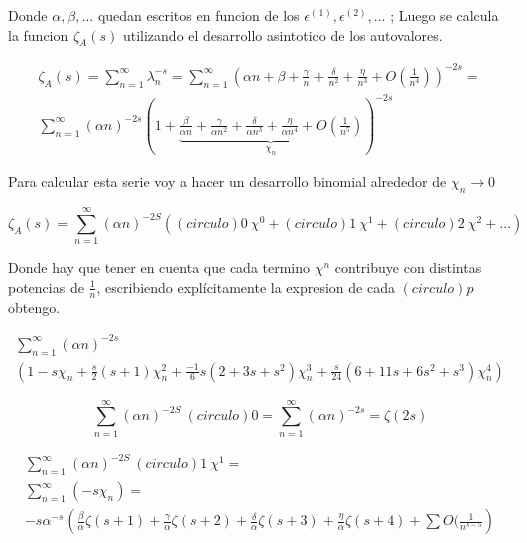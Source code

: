 Donde $\alpha, \beta , ... $ quedan escritos en funcion de los $\epsilon ^{(1)},\epsilon^{(2)}, ... $ ; 
Luego se calcula la funcion $\zeta _A (s) $ utilizando el desarrollo asintotico de los autovalores.
    
\begin{equation}
\begin{array}{cc}
    \zeta _{A} (s) = \sum _{n=1} ^{\infty} \lambda _n ^ {-s} =
    \sum _{n=1} ^{\infty} 
    \left(
    \alpha n + 
    \beta + 
    \frac{\gamma}{n} +
    \frac{\delta}{n ^2} +
    \frac{\eta}{n^3} +
    O( \frac{1}{n ^{4} }  )
    \right) ^{-2 s} = \\
    \sum _{n=1} ^{\infty} 
    (\alpha n) ^{- 2 s} 
    \left(
    1 +     
    \underbrace{
        \frac{\beta}{\alpha n} + 
        \frac{\gamma}{\alpha n^2} +
        \frac{\delta}{\alpha n ^3} +
        \frac{\eta}{\alpha n^4} +
        O(\frac{1}{n ^{5}} ) } _{ \chi _n}
    \right ) ^{-2 s}
\end{array}
\end{equation}

Para calcular esta serie voy a hacer un desarrollo binomial alrededor de $\chi _n \rightarrow{0} $ 

\begin{equation}
\zeta _{A} (s) = 
\sum _{n=1} ^{\infty}
( \alpha n ) ^{-2 S}
\left(
(circulo){0} \ \chi ^0 + (circulo){1} \ \chi ^1  + (circulo){2} \ \chi ^2 + ...
\right)
\end{equation}

Donde hay que tener en cuenta que cada termino $\chi ^{n} $ contribuye con distintas potencias de $\frac{1}{n}$, escribiendo explícitamente la expresion de cada $(circulo){p}$ obtengo.

\begin{equation}
\begin{array}{c}
    \sum _{n=1} ^{\infty}  (\alpha n) ^{- 2 s} \\ 
    \left(
    1- s \chi _n + 
    \frac{s}{2} (s+1) \chi _n ^2  +
    \frac{-1}{6} s (2+3s+s^2) \chi _n ^{3} +
    \frac{s}{24} (6+11s +6s^2+s^3) \chi _n ^4
    \right)
\end{array}
\end{equation}


\begin{equation}
\sum _{n=1} ^{\infty}
( \alpha n ) ^{-2 S} \ 
(circulo){0} = \sum _{n=1} ^{\infty} (\alpha n )^ {-2 s} = \zeta (2 s)
\end{equation}

\begin{equation}
\begin{array}{cc}
    \sum _{n=1} ^{\infty}
    ( \alpha n )   ^{-2 S} \ 
    (circulo){1} \ \chi ^1 = \\ 
    \sum _{n=1} ^{\infty} (-s \chi _n) = \\
    -s \alpha ^{-s} \left(
    \frac{\beta}{\alpha} \zeta(s+1) +
    \frac{\gamma}{\alpha} \zeta (s+2) + 
    \frac{\delta}{\alpha} \zeta (s+3) + 
    \frac{\eta}{\alpha} \zeta (s+4) + 
    \sum O (\frac{1}{n ^{s-5}}
    \right)
\end{array}
\end{equation}

